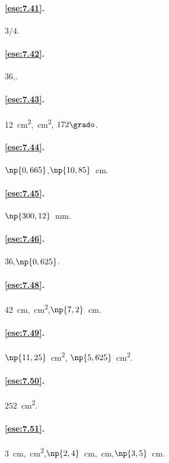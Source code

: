 \paragraph{\ref{ese:7.41}.}
$3/4$.

\paragraph{\ref{ese:7.42}.}
36,.

\paragraph{\ref{ese:7.43}.}
12~cm\textsuperscript{2},~cm\textsuperscript{2},\quad 
$172\grado$.

\paragraph{\ref{ese:7.44}.}
$\np{0,665}$,\quad $\np{10,85}$~cm.

\paragraph{\ref{ese:7.45}.}
$\np{300,12}$~mm.

\paragraph{\ref{ese:7.46}.}
36,\quad $\np{0,625}$.

\paragraph{\ref{ese:7.48}.}
42~cm,~cm\textsuperscript{2},\quad $\np{7,2}$~cm.

\paragraph{\ref{ese:7.49}.}
$\np{11,25}$~cm\textsuperscript{2},\quad 
$\np{5,625}$~cm\textsuperscript{2}.

\paragraph{\ref{ese:7.50}.}
$252$~cm\textsuperscript{2}.

\paragraph{\ref{ese:7.51}.}
3~cm,~cm\textsuperscript{2},\quad $\np{2,4}$~cm,~cm,\quad $\np{3,5}$~cm.


